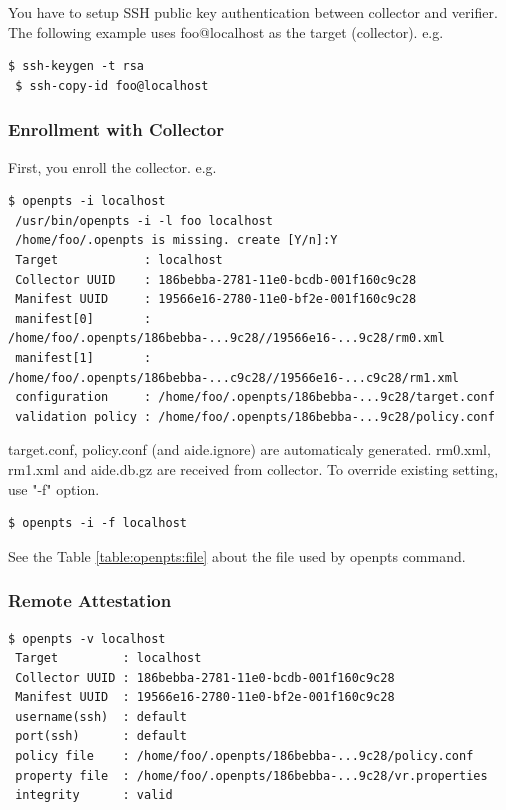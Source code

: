You have to setup SSH public key authentication between collector and verifier.
The following example uses foo@localhost as the target (collector).
e.g.
\begin{lstlisting}[style=console]
 $ ssh-keygen -t rsa
 $ ssh-copy-id foo@localhost
\end{lstlisting}


\subsubsection{Enrollment with Collector}

First, you enroll the collector.
e.g.
\begin{lstlisting}[style=console]
 $ openpts -i localhost
 /usr/bin/openpts -i -l foo localhost
 /home/foo/.openpts is missing. create [Y/n]:Y
 Target            : localhost
 Collector UUID    : 186bebba-2781-11e0-bcdb-001f160c9c28
 Manifest UUID     : 19566e16-2780-11e0-bf2e-001f160c9c28
 manifest[0]       : /home/foo/.openpts/186bebba-...9c28//19566e16-...9c28/rm0.xml
 manifest[1]       : /home/foo/.openpts/186bebba-...c9c28//19566e16-...c9c28/rm1.xml
 configuration     : /home/foo/.openpts/186bebba-...9c28/target.conf
 validation policy : /home/foo/.openpts/186bebba-...9c28/policy.conf
\end{lstlisting}
target.conf, policy.conf (and aide.ignore) are automaticaly generated.
rm0.xml, rm1.xml and aide.db.gz are received from collector.
To override existing setting, use "-f" option.
\begin{lstlisting}[style=console]
 $ openpts -i -f localhost
\end{lstlisting}
See the Table \ref{table:openpts:file} about the file used by openpts command.

%
\subsubsection{Remote Attestation}

\begin{lstlisting}[style=console]
 $ openpts -v localhost
 Target         : localhost
 Collector UUID : 186bebba-2781-11e0-bcdb-001f160c9c28
 Manifest UUID  : 19566e16-2780-11e0-bf2e-001f160c9c28
 username(ssh)  : default
 port(ssh)      : default
 policy file    : /home/foo/.openpts/186bebba-...9c28/policy.conf
 property file  : /home/foo/.openpts/186bebba-...9c28/vr.properties
 integrity      : valid
\end{lstlisting}


